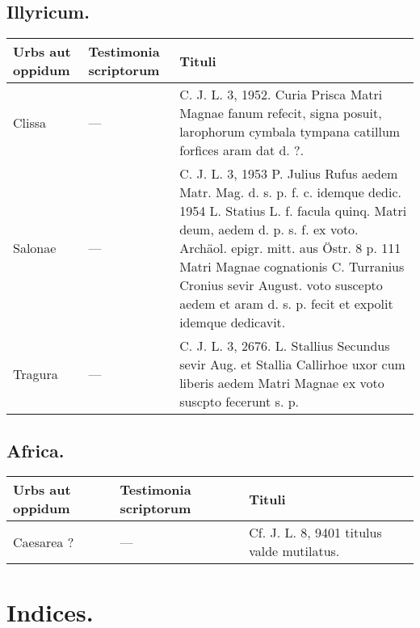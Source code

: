\documentclass[a4paper, 11pt, oneside, polutonikogreek, german]{article}
\begin{document}
\subsection{Illyricum.}
\begin{table}[H]
    \Fontauri
    \footnotesize
    \centering
    \begin{tabular}{|p{30mm}|p{20mm}|p{60mm}|}
    \hline
        Urbs aut oppidum & Testimonia scriptorum & Tituli \\ \hline
        Clissa & --- & C. J. L. 3, 1952. Curia Prisca Matri Magnae fanum refecit, signa posuit, larophorum cymbala tympana catillum forfices aram dat d. ?. \\ \hline
        Salonae & --- & C. J. L. 3, 1953 P. Julius Rufus aedem Matr. Mag. d. s. p. f. c. idemque dedic. 1954 L. Statius L. f. facula quinq. Matri deum, aedem d. p. s. f. ex voto. Archäol. epigr. mitt. aus Östr. 8 p. 111 Matri Magnae cognationis C. Turranius Cronius sevir August. voto suscepto aedem et aram d. s. p. fecit et expolit idemque dedicavit. \\ \hline
        Tragura & --- & C. J. L. 3, 2676. L. Stallius Secundus sevir Aug. et Stallia Callirhoe uxor cum liberis aedem Matri Magnae ex voto suscpto fecerunt s. p. \\ \hline
    \end{tabular}
\end{table}
\subsection{Africa.}
\begin{table}[H]
    \Fontauri
    \footnotesize
    \centering
    \begin{tabular}{|p{30mm}|p{20mm}|p{60mm}|}
    \hline
        Urbs aut oppidum & Testimonia scriptorum & Tituli \\ \hline
        Caesarea ? & --- & Cf. J. L. 8, 9401 titulus valde mutilatus. \\ \hline
    \end{tabular}
\end{table}
\clearpage
\section{Indices.}
\end{document}
